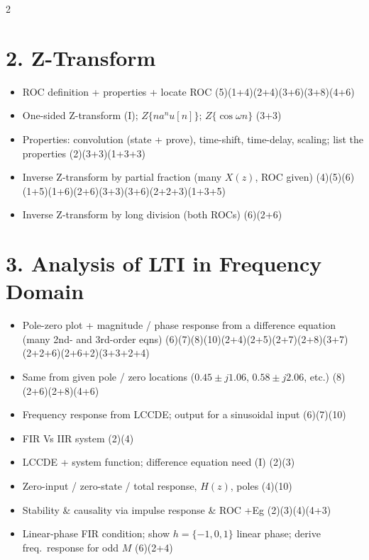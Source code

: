 \documentclass[10pt]{article}
\begin{document}
\begin{multicols}{2}
\section*{2. Z-Transform}
\begin{itemize}
  \item ROC definition + properties + locate ROC \hfill (5)\allowbreak(1+4)\allowbreak(2+4)\allowbreak(3+6)\allowbreak(3+8)\allowbreak(4+6)
  \item One-sided Z-transform (I); $Z\{na^n u[n]\}$; $Z\{\cos\omega n\}$ \hfill (3+3)
  \item Properties: convolution (state + prove), time-shift, time-delay, scaling; list the properties \hfill (2)\allowbreak(3+3)\allowbreak(1+3+3)
  \item Inverse Z-transform by partial fraction (many $X(z)$, ROC given) \hfill (4)\allowbreak(5)\allowbreak(6)\allowbreak(1+5)\allowbreak(1+6)\allowbreak(2+6)\allowbreak(3+3)\allowbreak(3+6)\allowbreak(2+2+3)\allowbreak(1+3+5)
  \item Inverse Z-transform by long division (both ROCs) \hfill (6)\allowbreak(2+6)
\end{itemize}

\section*{3. Analysis of LTI in Frequency Domain}
\begin{itemize}
  \item Pole-zero plot + magnitude / phase response from a difference equation (many 2nd- and 3rd-order eqns) \hfill (6)\allowbreak(7)\allowbreak(8)\allowbreak(10)\allowbreak(2+4)\allowbreak(2+5)\allowbreak(2+7)\allowbreak(2+8)\allowbreak(3+7)\allowbreak(2+2+6)\allowbreak(2+6+2)\allowbreak(3+3+2+4)
  \item Same from given pole / zero locations ($0.45\pm j1.06$, $0.58\pm j2.06$, etc.) \hfill (8)\allowbreak(2+6)\allowbreak(2+8)\allowbreak(4+6)
  \item Frequency response from LCCDE; output for a sinusoidal input \hfill (6)\allowbreak(7)\allowbreak(10)
  \item FIR Vs IIR system \hfill (2)\allowbreak(4)
  \item LCCDE + system function; difference equation need (I) \hfill (2)\allowbreak(3)
  \item Zero-input / zero-state / total response, $H(z)$, poles \hfill (4)\allowbreak(10)
  \item Stability \& causality via impulse response \& ROC +Eg \hfill (2)\allowbreak(3)\allowbreak(4)\allowbreak(4+3)
  \item Linear-phase FIR condition; show $h=\{-1,0,1\}$ linear phase; derive freq.\ response for odd $M$ \hfill (6)\allowbreak(2+4)
\end{itemize}


\end{multicols}
\end{document}
